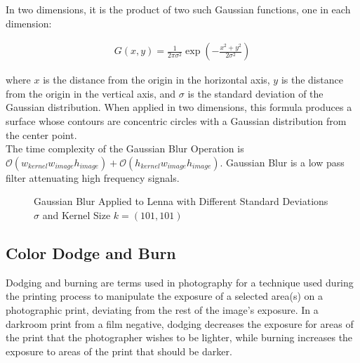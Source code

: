\documentclass{article}
\begin{document}
In two dimensions, it is the product of two such Gaussian functions, one in each dimension:

\begin{align*}
    G(x, y) = \frac{1}{2 \pi \sigma^2} \exp \left( - \frac{x^2 + y^2}{2 \sigma^2}\right)
\end{align*}

where $x$ is the distance from the origin in the horizontal axis, $y$ is the distance from the origin in 
the vertical axis, and $\sigma$ is the standard deviation of the Gaussian distribution. When applied in 
two dimensions, this formula produces a surface whose contours are concentric circles with a Gaussian 
distribution from the center point. \\

The time complexity of the Gaussian Blur Operation is $\mathcal{O} (w_{kernel} w_{image} h_{image}) + \mathcal{O} (h_{kernel} w_{image} h_{image})$. Gaussian Blur is a low pass filter attenuating high 
frequency signals.


\begin{figure}[ht]
    \centering
    \qquad
    \qquad
    \qquad
    \label{fig:lenna-gaussian-blur}%
    \caption{Gaussian Blur Applied to Lenna with Different Standard Deviations $\sigma$ and Kernel Size $k = (101, 101)$}
\end{figure}

\clearpage
\subsection{Color Dodge and Burn}
Dodging and burning are terms used in photography for a technique used during the printing process to  
manipulate the exposure of a selected area(s) on a photographic print, deviating from the rest of the 
image's exposure. In a darkroom print from a film negative, dodging decreases the exposure for areas of 
the print that the photographer wishes to be lighter, while burning increases the exposure to areas of the
print that should be darker. \\
\end{document}
